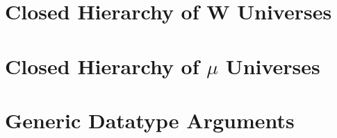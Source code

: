 \documentclass[12pt]{report}
\theoremstyle{definition}
\theoremstyle{remark}
\numberwithin{definition}{section}
\numberwithin{equation}{section}
\numberwithin{proposition}{section}
\numberwithin{conjecture}{section}
\numberwithin{theorem}{section}
\numberwithin{lemma}{section}
\numberwithin{corollary}{section}
\numberwithin{example}{section}
\numberwithin{remark}{section}
\begin{document}
\chapter{Closed Hierarchy of W Universes}\label{ch:hier}
\chapter{Closed Hierarchy of $\mu$ Universes}\label{ch:hier}
\chapter{Generic Datatype Arguments}\label{ch:gargs}





\end{document}
